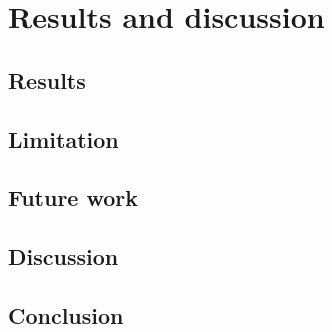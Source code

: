 \chapter{Results and discussion}

\section{Results}

\section{Limitation}

\section{Future work}

\section{Discussion}

\section{Conclusion}